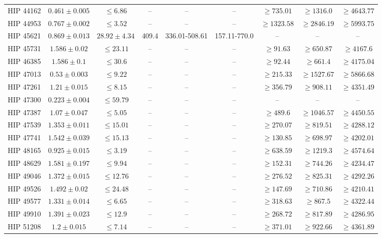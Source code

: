{\begin{longtable}{|c|c|c|c|c|c|c|c|c|}
HIP 44162 & $ 0.461 \pm 0.005 $ & $\le 6.86 $ &-- &-- &-- & $\ge 735.01 $ & $\ge 1316.0 $ & $\ge 4643.77 $ \\
HIP 44953 & $ 0.767 \pm 0.002 $ & $\le 3.52 $ &-- &-- &-- & $\ge 1323.58 $ & $\ge 2846.19 $ & $\ge 5993.75 $ \\
HIP 45621 & $ 0.869 \pm 0.013 $ & $ 28.92 \pm 4.34 $ & 409.4 & 336.01-508.61 & 157.11-770.0 &-- &-- &-- \\
HIP 45731 & $ 1.586 \pm 0.02 $ & $\le 23.11 $ &-- &-- &-- & $\ge 91.63 $ & $\ge 650.87 $ & $\ge 4167.6 $ \\
HIP 46385 & $ 1.586 \pm 0.1 $ & $\le 30.6 $ &-- &-- &-- & $\ge 92.44 $ & $\ge 661.4 $ & $\ge 4175.04 $ \\
HIP 47013 & $ 0.53 \pm 0.003 $ & $\le 9.22 $ &-- &-- &-- & $\ge 215.33 $ & $\ge 1527.67 $ & $\ge 5866.68 $ \\
HIP 47261 & $ 1.21 \pm 0.015 $ & $\le 8.15 $ &-- &-- &-- & $\ge 356.79 $ & $\ge 908.11 $ & $\ge 4351.49 $ \\
HIP 47300 & $ 0.223 \pm 0.004 $ & $\le 59.79 $ & -- & -- &-- & -- & -- & -- \\
HIP 47387 & $ 1.07 \pm 0.047 $ & $\le 5.05 $ &-- &-- &-- & $\ge 489.6 $ & $\ge 1046.57 $ & $\ge 4450.55 $ \\
HIP 47539 & $ 1.353 \pm 0.011 $ & $\le 15.01 $ &-- &-- &-- & $\ge 270.07 $ & $\ge 819.51 $ & $\ge 4288.12 $ \\
HIP 47741 & $ 1.542 \pm 0.039 $ & $\le 15.13 $ &-- &-- &-- & $\ge 130.85 $ & $\ge 698.97 $ & $\ge 4202.01 $ \\
HIP 48165 & $ 0.925 \pm 0.015 $ & $\le 3.19 $ &-- &-- &-- & $\ge 638.59 $ & $\ge 1219.3 $ & $\ge 4574.64 $ \\
HIP 48629 & $ 1.581 \pm 0.197 $ & $\le 9.94 $ &-- &-- &-- & $\ge 152.31 $ & $\ge 744.26 $ & $\ge 4234.47 $ \\
HIP 49046 & $ 1.372 \pm 0.015 $ & $\le 12.76 $ &-- &-- &-- & $\ge 276.52 $ & $\ge 825.31 $ & $\ge 4292.26 $ \\
HIP 49526 & $ 1.492 \pm 0.02 $ & $\le 24.48 $ &-- &-- &-- & $\ge 147.69 $ & $\ge 710.86 $ & $\ge 4210.41 $ \\
HIP 49577 & $ 1.331 \pm 0.014 $ & $\le 6.65 $ &-- &-- &-- & $\ge 318.63 $ & $\ge 867.5 $ & $\ge 4322.44 $ \\
HIP 49910 & $ 1.391 \pm 0.023 $ & $\le 12.9 $ &-- &-- &-- & $\ge 268.72 $ & $\ge 817.89 $ & $\ge 4286.95 $ \\
HIP 51208 & $ 1.2 \pm 0.015 $ & $\le 7.14 $ &-- &-- &-- & $\ge 371.01 $ & $\ge 922.66 $ & $\ge 4361.89 $ \\

\end{longtable}}
